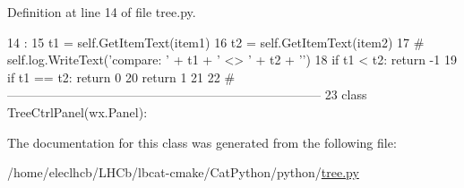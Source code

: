 Definition at line 14 of file tree.py.


\begin{DoxyCode}
14                                           :
15         t1 = self.GetItemText(item1)
16         t2 = self.GetItemText(item2)
17 #        self.log.WriteText('compare: ' + t1 + ' <> ' + t2 + '\n')
18         if t1 < t2: return -1
19         if t1 == t2: return 0
20         return 1
21 
22 #---------------------------------------------------------------------------
23 
class TreeCtrlPanel(wx.Panel):
\end{DoxyCode}


The documentation for this class was generated from the following file:\begin{DoxyCompactItemize}
\item 
/home/eleclhcb/LHCb/lbcat-\/cmake/CatPython/python/\hyperlink{tree_8py}{tree.py}\end{DoxyCompactItemize}
